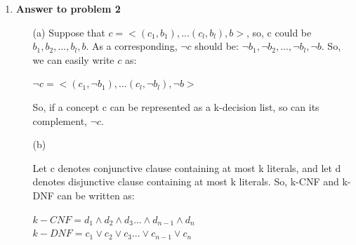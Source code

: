 \begin{enumerate}
\begin{enumerate}
{\bf Proof:} First, let's prove that there will be at least 2k points that can be shattered. Now, consider only two points, the labels can be ++, +-, -+ and --. So, one interval can separate two points. But when there is 3 points, if the labels is +-+, then we cannot separate it. So, for one interval, the VC dimension is 2. This conclusion can be easily broaden to multiple intervals. When there is k distinct intervals, it is reasonable to conclude that the VC dimension should be at least 2k.\\

Now, let's find its upper bound. When there is 2k+1 points in a real line. Assume that their label is +-+-......+-+. There is 2k+1 points. So, for every points that is labelled +, we need an interval [a, b] to include the point. So, for the first k positive points, we need k intervals. But there is one last positive point that cannot be included by any interval. So, the VC dimension for k disjoint intervals in a real line will be less that 2k+1.\\

So, to conclude, the VC dimension for k disjoint intervals in a real line will be {\bf 2k}.\\

\end{enumerate}

\item {\bf Answer to problem 2}
\begin{enumerate}
\item[(a)]
Suppose that $c = <(c_1, b_1), ... (c_l, b_l), b>$, so, c could be $b_1, b_2, ..., b_l, b$. As a corresponding, $\neg c$ should be: $\neg b_1, \neg b_2, ..., \neg b_l, \neg b$. So, we can easily write $c$ as:
\begin{center}
$\neg c = <(c_1, \neg b_1), ... (c_l, \neg b_l), \neg b>$
\end{center}
So, if a concept c can be represented as a k-decision list, so can its complement, $\neg c$.\\
\item[(b)]

Let c denotes conjunctive clause containing at most k literals, and let d denotes disjunctive clause containing at most k literals. So, k-CNF and k-DNF can be written as:
\begin{center}
$ k-CNF = d_1 \wedge d_2 \wedge d_3...\wedge d_{n-1} \wedge d_n $\\
$ k-DNF = c_1 \vee c_2 \vee c_3...\vee c_{n-1} \vee c_n $
\end{center}


\end{enumerate}
\end{enumerate}
